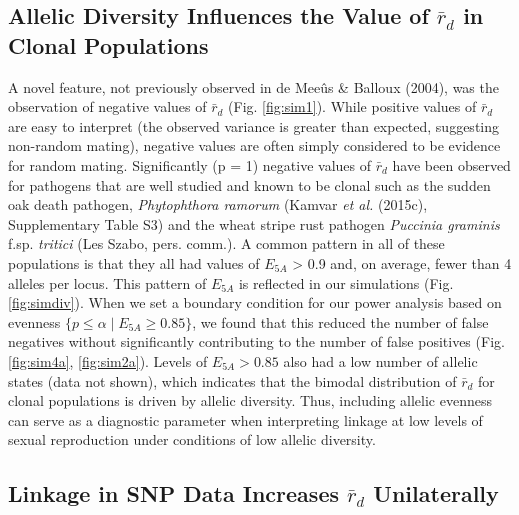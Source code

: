 \documentclass[]{article}
\theoremstyle{definition}
\theoremstyle{definition}
\theoremstyle{definition}
\theoremstyle{remark}
\begin{document}
\subsection{\texorpdfstring{Allelic Diversity Influences the Value of
\(\bar{r}_d\) in Clonal
Populations}{Allelic Diversity Influences the Value of \textbackslash{}bar\{r\}\_d in Clonal Populations}}\label{allelic-diversity-influences-the-value-of-barr_d-in-clonal-populations}

A novel feature, not previously observed in de Meeûs \& Balloux (2004),
was the observation of negative values of \(\bar{r}_d\) (Fig.
\ref{fig:sim1}). While positive values of \(\bar{r}_d\) are easy to
interpret (the observed variance is greater than expected, suggesting
non-random mating), negative values are often simply considered to be
evidence for random mating. Significantly (p = 1) negative values of
\(\bar{r}_d\) have been observed for pathogens that are well studied and
known to be clonal such as the sudden oak death pathogen,
\emph{Phytophthora ramorum} (Kamvar \emph{et al.} (2015c), Supplementary
Table S3) and the wheat stripe rust pathogen \emph{Puccinia graminis}
f.sp. \emph{tritici} (Les Szabo, pers. comm.). A common pattern in all
of these populations is that they all had values of \(E_{5A}\)
\textgreater{} 0.9 and, on average, fewer than 4 alleles per locus. This
pattern of \(E_{5A}\) is reflected in our simulations (Fig.
\ref{fig:simdiv}). When we set a boundary condition for our power
analysis based on evenness \(\{p \leq \alpha \mid E_{5A} \geq 0.85\}\),
we found that this reduced the number of false negatives without
significantly contributing to the number of false positives (Fig.
\ref{fig:sim4a}, \ref{fig:sim2a}). Levels of \(E_{5A} > 0.85\) also had
a low number of allelic states (data not shown), which indicates that
the bimodal distribution of \(\bar{r}_d\) for clonal populations is
driven by allelic diversity. Thus, including allelic evenness can serve
as a diagnostic parameter when interpreting linkage at low levels of
sexual reproduction under conditions of low allelic diversity.

\subsection{\texorpdfstring{Linkage in SNP Data Increases \(\bar{r}_d\)
Unilaterally}{Linkage in SNP Data Increases \textbackslash{}bar\{r\}\_d Unilaterally}}\label{linkage-in-snp-data-increases-barr_d-unilaterally}
\end{document}
